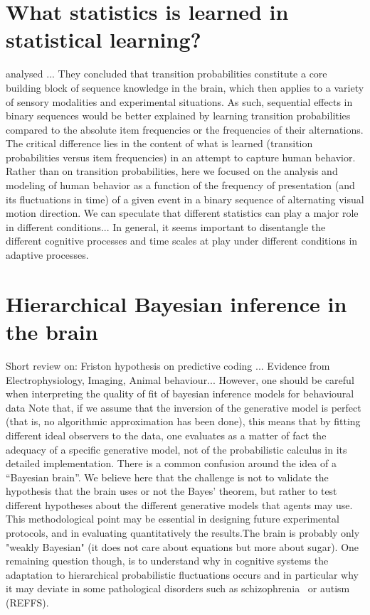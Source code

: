 \documentclass[12pt,english]{article}%
\newcommand{\citep}[1]{\parencite{#1}}
\newcommand{\citet}[1]{\textcite{#1}}
\begin{document}
\section{What statistics is learned in statistical learning?}
\citet{Meyniel} analysed ... They concluded that transition probabilities constitute
a core building block of sequence knowledge in the brain,
which then applies to a variety of sensory modalities and
experimental situations.
As such, sequential effects in binary sequences would be better explained
by learning transition probabilities
compared to the absolute item frequencies or the frequencies of their alternations.
The critical difference lies in the content
of what is learned (transition probabilities versus item frequencies)
in an attempt to capture human behavior.
Rather than on transition probabilities, here we focused on the analysis and modeling of human behavior as a function of the frequency of presentation (and its fluctuations in time) of a given event in a binary sequence of alternating visual motion direction. We can speculate that different statistics can play a major role in different conditions...
 In general, it seems important to disentangle the different cognitive processes and time scales at play under different conditions in adaptive processes.

\section{Hierarchical Bayesian inference in the brain}
Short review on: Friston hypothesis on predictive coding ... Evidence from Electrophysiology, Imaging, Animal behaviour...
However, one should be careful when interpreting the quality of fit of bayesian inference models for behavioural data
Note that, if we assume that the inversion of the generative model is perfect
(that is, no algorithmic approximation has been done),
this means that by fitting different ideal observers
to the data, one evaluates as a matter of fact the adequacy of
a specific generative model, not of the probabilistic calculus in its detailed implementation.
There is a common confusion around the idea of a ``Bayesian brain''.
We believe here that the challenge is not to validate the hypothesis that the brain uses or not the Bayes' theorem, but rather to test different hypotheses about the different generative models
that agents may use. This methodological point may be essential in designing future experimental protocols, and in evaluating quantitatively the results.The brain is probably only "weakly Bayesian" (it does not care about equations but more about sugar). One remaining question though, is to understand why in cognitive systems
the adaptation to hierarchical probabilistic fluctuations occurs and
in particular why it may deviate
in some pathological disorders such as schizophrenia~\citep{Adams12, Jardri2017} or autism (REFFS).
\end{document}
